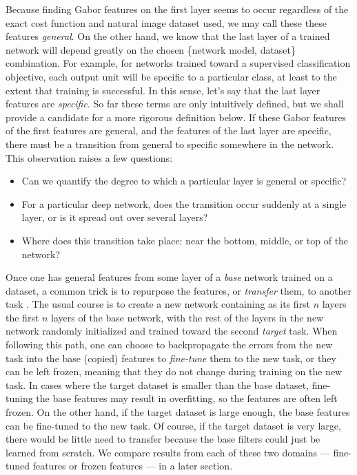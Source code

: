 Because finding Gabor features on the first layer seems to occur regardless of the exact cost function and natural image dataset used, we may call these these features \emph{general}. On the other hand, we know that the last layer of a trained network will depend greatly on the chosen \{network model, dataset\} combination. For example, for networks trained toward a supervised classification objective, each output unit will be specific to a particular class, at least to the extent that training is successful. In this sense, let's say that the last layer features are \emph{specific}. So far these terms are only intuitively defined, but we shall provide a candidate for a more rigorous definition below. 
If these Gabor features of the first features are general, and the features of the last layer are specific, there must be a transition from general to specific somewhere in the network. This observation raises a few questions:

\begin{itemize}
	\item Can we quantify the degree to which a particular layer is general or specific?
	\item For a particular deep network, does the transition occur suddenly at a single layer, or is it spread out over several layers?
	\item Where does this transition take place: near the bottom, middle, or top of the network?
\end{itemize}

Once one has general features from some layer of a \emph{base} network trained on a dataset, a common trick is to repurpose the features, or \emph{transfer} them, to another task \citep{donahue+jia-2013-arxiv}. The usual course is to create a new network containing as its first $n$ layers the first $n$ layers of the base network, with the rest of the layers in the new network randomly initialized and trained toward the second \emph{target} task. When following this path, one can choose to backpropagate the errors from the new task into the base (copied) features to \emph{fine-tune} them to the new task, or they can be left frozen, meaning that they do not change during training on the new task. In cases where the target dataset is smaller than the base dataset, fine-tuning the base features may result in overfitting, so the features are often left frozen. On the other hand, if the target dataset is large enough, the base features can be fine-tuned to the new task. Of course, if the target dataset is very large, there would be little need to transfer because the base filters could just be learned from scratch. We compare results from each of these two domains --- fine-tuned features or frozen features --- in a later section.

